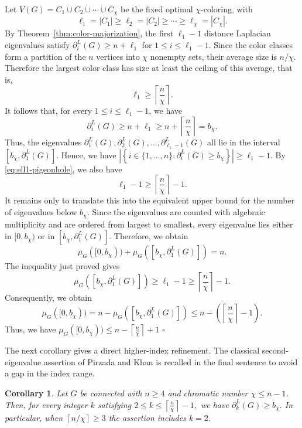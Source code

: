 \documentclass[12pt]{article}
\newcommand{\ceil}[1]{\left\lceil #1 \right\rceil}
\theoremstyle{plain}
\newtheorem{corollary}[theorem]{Corollary}
\theoremstyle{definition}
\renewenvironment{proof}{{\noindent\bfseries Proof. }}{\hfill$\square$\par}
\begin{document}
\begin{proof}
	Let $V(G)=C_1\dot\cup C_2\dot\cup\cdots\dot\cup C_\chi$ be the fixed optimal $\chi$-coloring, with
	\[
	\ell_1=|C_1|\ge \ell_2=|C_2|\ge\cdots\ge \ell_\chi=|C_\chi|.
	\]
	By Theorem~\ref{thm:color-majorization}, the first $\ell_1-1$ distance Laplacian eigenvalues satisfy
	 $\partial_i^L(G)\ge n+\ell_1$ for  $1\le i\le \ell_1-1.$ Since the color classes form a partition of the $n$ vertices into $\chi$ nonempty sets, their average size is $n/\chi$. Therefore the largest color class has size at least the ceiling of this average, that is,
	\begin{equation}\label{eq:ell1-pigeonhole}
		\ell_1\ge \ceil{\frac{n}{\chi}}.
	\end{equation}
	It follows that, for every $1\le i\le \ell_1-1$, we have
	\[
	\partial_i^L(G)
	\ge n+\ell_1
	\ge n+\ceil{\frac{n}{\chi}}
	=
	b_\chi.
	\]
	Thus, the eigenvalues $\partial_1^L(G),\partial_2^L(G),\dots,\partial_{\ell_1-1}^L(G)$ 	all lie in the interval
	 $[b_\chi,\partial_1^L(G)].$ 	Hence, we have  $\left|\left\{i\in\{1,\dots,n\}:\partial_i^L(G)\ge b_\chi\right\}\right|
	\ge \ell_1-1.$ By \eqref{eq:ell1-pigeonhole}, we also have
	\[
	\ell_1-1\ge \ceil{\frac{n}{\chi}}-1.
	\]
	 It remains only to translate this into the equivalent upper bound for the number of eigenvalues below $b_\chi$. Since the eigenvalues are counted with algebraic multiplicity and are ordered from largest to smallest, every eigenvalue lies either in
	 $[0,b_\chi)$ or in $[b_\chi,\partial_1^L(G)].$ 
	Therefore, we obtain
	\[
	\mu_G([0,b_\chi))
	+
	\mu_G([b_\chi,\partial_1^L(G)])
	=
	n.
	\]
	The inequality just proved gives
	\[
	\mu_G([b_\chi,\partial_1^L(G)])
	\ge
	\ell_1-1
	\ge
	\ceil{\frac{n}{\chi}}-1.
	\]
	Consequently, we obtain
	\[
	\mu_G([0,b_\chi))
	=
	n-\mu_G([b_\chi,\partial_1^L(G)])
	\le
	n-\left(\ceil{\frac{n}{\chi}}-1\right).
	\]
	Thus, we have  $\mu_G([0,b_\chi))
	\le
	n-\ceil{\tfrac{n}{\chi}}+1$ 
\end{proof}

\medskip
\noindent The next corollary gives a direct higher-index refinement. The classical second-eigenvalue assertion of
Pirzada and Khan \cite{PirzadaKhan2021} is recalled in the final sentence to avoid a gap in the index range.

\begin{corollary}\label{cor:generalize-2-5}
Let $G$ be connected with $n\ge4$ and chromatic number $\chi\le n-1$. Then, for every integer $k$ satisfying
 $2\le k\le \ceil{\tfrac{n}{\chi}}-1,$ we have $ \partial_k^L(G)\ge b_\chi.$ In particular, when $\ceil{n/\chi}\ge3$ the assertion includes $k=2$.
\end{corollary}
\end{document}
